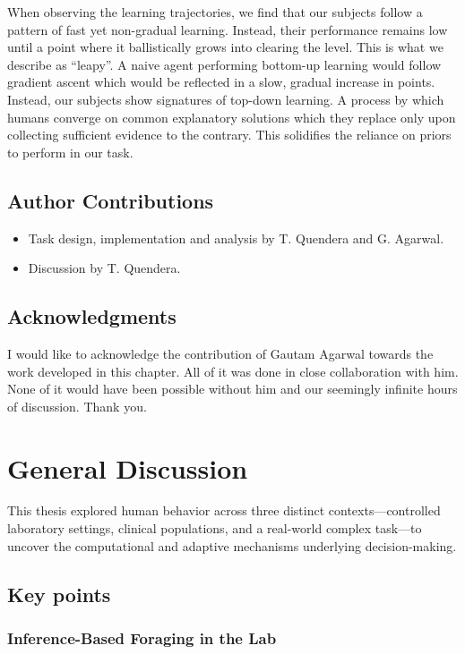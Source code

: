 \documentclass[11pt]{article}
\begin{document}
When observing the learning trajectories, we find that our subjects follow a pattern of fast yet non-gradual learning. Instead, their performance remains low until a point where it ballistically grows into clearing the level. This is what we describe as “leapy”. A naive agent performing bottom-up learning would follow gradient ascent which would be reflected in a slow, gradual increase in points. Instead, our subjects show signatures of top-down learning. A process by which humans converge on common explanatory solutions which they replace only upon collecting sufficient evidence to the contrary. This solidifies the reliance on priors to perform in our task.

\subsection{Author Contributions}

\begin{itemize}
    \item Task design, implementation and analysis by T. Quendera and G. Agarwal.
    \item Discussion by T. Quendera.
\end{itemize}

\subsection{Acknowledgments}
I would like to acknowledge the contribution of Gautam Agarwal towards the work developed in this chapter. All of it was done in close collaboration with him. None of it would have been possible without him and our seemingly infinite hours of discussion.
Thank you.

\clearpage

\section{General Discussion}
This thesis explored human behavior across three distinct contexts—controlled laboratory settings, clinical populations, and a real-world complex task—to uncover the computational and adaptive mechanisms underlying decision-making.

\subsection{Key points}
\subsubsection{Inference-Based Foraging in the Lab}
\end{document}
